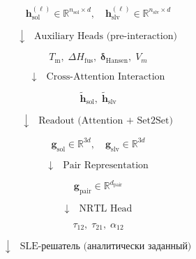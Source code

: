 \documentclass[11pt]{article}
\begin{document}
\begin{equation*}
\mathbf{h}_{\mathrm{sol}}^{(\ell)} \in \mathbb{R}^{n_{\mathrm{sol}} \times d}, \quad \mathbf{h}_{\mathrm{slv}}^{(\ell)} \in \mathbb{R}^{n_{\mathrm{slv}} \times d}
\end{equation*}

\begin{equation*}
\downarrow \quad \text{Auxiliary Heads (pre-interaction)}
\end{equation*}

\begin{equation*}
T_{\mathrm{m}}, \; \Delta H_{\mathrm{fus}}, \; \boldsymbol{\delta}_{\mathrm{Hansen}}, \; V_m
\end{equation*}

\begin{equation*}
\downarrow \quad \text{Cross-Attention Interaction}
\end{equation*}

\begin{equation*}
\tilde{\mathbf{h}}_{\mathrm{sol}}, \; \tilde{\mathbf{h}}_{\mathrm{slv}}
\end{equation*}

\begin{equation*}
\downarrow \quad \text{Readout (Attention + Set2Set)}
\end{equation*}

\begin{equation*}
\mathbf{g}_{\mathrm{sol}} \in \mathbb{R}^{3d}, \quad \mathbf{g}_{\mathrm{slv}} \in \mathbb{R}^{3d}
\end{equation*}

\begin{equation*}
\downarrow \quad \text{Pair Representation}
\end{equation*}

\begin{equation*}
\mathbf{g}_{\mathrm{pair}} \in \mathbb{R}^{d_{\mathrm{pair}}}
\end{equation*}

\begin{equation*}
\downarrow \quad \text{NRTL Head}
\end{equation*}

\begin{equation*}
\tau_{12}, \; \tau_{21}, \; \alpha_{12}
\end{equation*}

\begin{equation*}
\downarrow \quad \text{SLE-решатель (аналитически заданный)}
\end{equation*}
\end{document}
